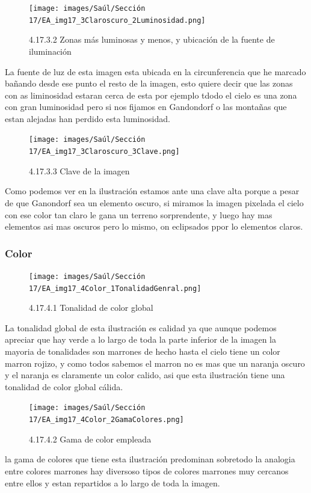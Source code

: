 \documentclass[12pt]{article}
\begin{document}
        \begin{figure}[H]
          \centering
          \texttt{[image: images/Saúl/Sección 17/EA\_img17\_3Claroscuro\_2Luminosidad.png]}
          \caption{\small 4.17.3.2 Zonas más luminosas y menos, y ubicación de la fuente de iluminación}
        \end{figure}
        La fuente de luz de esta imagen esta ubicada en la circunferencia que he marcado bañando desde ese punto el resto de la imagen, esto quiere decir que las zonas con as liminosidad estaran cerca de esta por ejemplo tdodo el cielo es una zona con gran luminosidad pero si nos fijamos en Gandondorf o las montañas que estan alejadas han perdido esta luminosidad.


        \begin{figure}[H]
          \centering
          \texttt{[image: images/Saúl/Sección 17/EA\_img17\_3Claroscuro\_3Clave.png]}
          \caption{\small 4.17.3.3 Clave de la imagen}
        \end{figure}
        Como podemos ver en la ilustración estamos ante una clave alta porque a pesar de que Ganondorf sea un elemento oscuro, si miramos la imagen pixelada el cielo con ese color tan claro le gana un terreno sorprendente, y luego hay mas elementos asi mas oscuros pero lo mismo, on eclipsados ppor lo elementos claros.


      \subsubsection{Color}


        \begin{figure}[H]
          \centering
          \texttt{[image: images/Saúl/Sección 17/EA\_img17\_4Color\_1TonalidadGenral.png]}
          \caption{\small 4.17.4.1 Tonalidad de color global}
        \end{figure}
        La tonalidad global de esta ilustración es calidad ya que aunque podemos apreciar que hay verde a lo largo de toda la parte inferior de la imagen la mayoria de tonalidades son marrones de hecho hasta el cielo tiene un color marron rojizo, y como todos sabemos el marron no es mas que un naranja oscuro y el naranja es claramente un color calido, asi que esta ilustración tiene una tonalidad de color global cálida.


        \begin{figure}[H]
          \centering
          \texttt{[image: images/Saúl/Sección 17/EA\_img17\_4Color\_2GamaColores.png]}
          \caption{\small 4.17.4.2 Gama de color empleada}
        \end{figure}
        la gama de colores que tiene esta ilustración predominan sobretodo la analogia entre colores marrones hay diversoso tipos de colores marrones muy cercanos entre ellos y estan repartidos a lo largo de toda la imagen.
\end{document}
